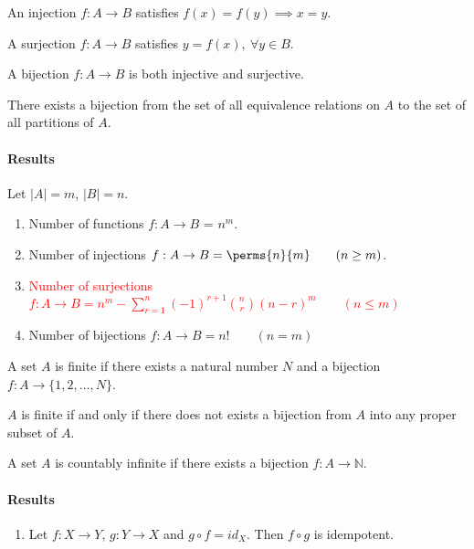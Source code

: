 \begin{definition}[injection]
	An injection $f : A \to B$ satisfies $f(x) = f(y) \implies x = y$.
\end{definition}

\begin{definition}[surjection]
	A surjection $f : A \to B$ satisfies $y = f(x),\ \forall y \in B$.
\end{definition}

\begin{definition}[bijection]
	A bijection $f : A \to B$ is both injective and surjective.
\end{definition}

\begin{note}
	There exists a bijection from the set of all equivalence relations on $A$ to the set of all partitions of $A$.
\end{note}

\paragraph{Results}
Let $|A|=m$, $|B|=n$.
\begin{enumerate}
	\item Number of functions $f : A \to B $ = $n^m$.
	\item Number of injections $f : A \to B = \perms{n}{m} \qquad (n \geq m)$.
	\item \textcolor{red}{Number of surjections $\displaystyle f : A \to B = n^m - \sum_{r=1}^n (-1)^{r+1}\binom{n}{r} (n-r)^m \qquad (n \leq m)$}
	\item Number of bijections $f : A \to B = n! \qquad (n = m)$
\end{enumerate}

\begin{definition}[finite]
	A set $A$ is finite if there exists a natural number $N$ and a bijection $f : A \to \{1,2,\dots,N\}$.
\end{definition}
\begin{note}
	$A$ is finite if and only if there does not exists a bijection from $A$ into any proper subset of $A$.
\end{note}

\begin{definition}[countable]
	A set $A$ is countably infinite if there exists a bijection $f : A \to \mathbb{N}$.
\end{definition}

\paragraph{Results}
\begin{enumerate}
	\item Let $f:X \to Y$, $g:Y \to X$ and $g \circ f = id_X$. Then $f \circ g$ is idempotent.
\end{enumerate}


